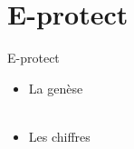 \section{E-protect}

\begin{frame}{E-protect}{~}
	\begin{itemize}
		\item La genèse \pause \\ ~
		\item Les chiffres
	\end{itemize}
\end{frame}

